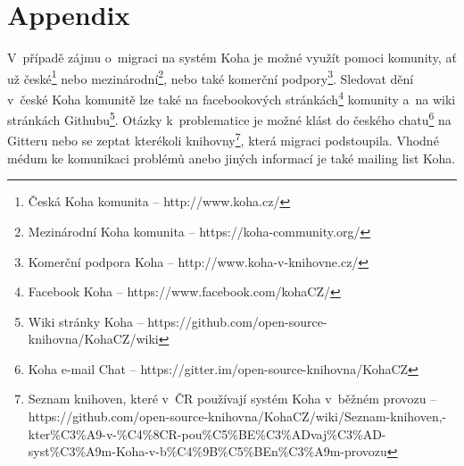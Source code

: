 \documentclass[
	11pt, oneside, printed, final, palatino
	microtype,
	table,   %
	lof,     %
	lot     %
]{fithesis3}
\begin{document}
{\chapter*{Appendix}
V~případě zájmu o~migraci na systém Koha je možné využít pomoci komunity, ať už české\footnote{Česká Koha komunita – http://www.koha.cz/} nebo mezinárodní\footnote{Mezinárodní Koha komunita – https://koha-community.org/
}, nebo také komerční podpory\footnote{Komerční podpora Koha – http://www.koha-v-knihovne.cz/}.
Sledovat dění v~české Koha komunitě lze také na facebookových stránkách\footnote{Facebook Koha – https://www.facebook.com/kohaCZ/
} komunity a~na wiki stránkách Githubu\footnote{Wiki stránky Koha –  https://github.com/open-source-knihovna/KohaCZ/wiki
}. Otázky k~problematice je možné klást do českého chatu\footnote{Koha e-mail Chat – https://gitter.im/open-source-knihovna/KohaCZ} na Gitteru nebo se zeptat kterékoli knihovny\footnote{Seznam knihoven, které v~ČR používají systém Koha v~běžném provozu – https://github.com/open-source-knihovna/KohaCZ/wiki/Seznam-knihoven,-kter\%C3\%A9-v-\%C4\%8CR-pou\%C5\%BE\%C3\%ADvaj\%C3\%AD-syst\%C3\%A9m-Koha-v-b\%C4\%9B\%C5\%BEn\%C3\%A9m-provozu
}, která migraci podstoupila. Vhodné médum ke komunikaci problémů anebo jiných informací je také mailing list Koha.

}
\end{document}
